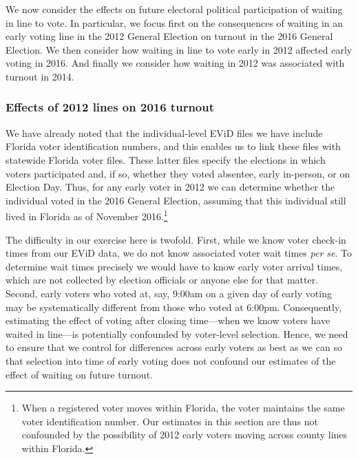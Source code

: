 \documentclass[12pt,titlepage]{article}
\begin{document}
We now consider the effects on future electoral political
participation of waiting in line to vote.  In particular, we focus
first on the consequences of waiting in an early voting line in the
2012 General Election on turnout in the 2016 General Election.  We
then consider how waiting in line to vote early in 2012 affected early
voting in 2016.  And finally we consider how waiting in 2012 was
associated with turnout in 2014.

\subsubsection*{Effects of 2012 lines on 2016 turnout}

We have already noted that the individual-level EViD files we have
include Florida voter identification numbers, and this enables us to
link these files with statewide Florida voter files.  These latter
files specify the elections in which voters participated and, if so,
whether they voted absentee, early in-person, or on Election Day.
Thus, for any early voter in 2012 we can determine whether the
individual voted in the 2016 General Election, assuming that this
individual still lived in Florida as of November 2016.\footnote{When
  a registered voter moves within Florida, the voter maintains the
  same voter identification number.  Our estimates in this section are
  thus not confounded by the possibility of 2012 early voters moving
  across county lines within Florida.}

The difficulty in our exercise here is twofold.  First, while we know
voter check-in times from our EViD data, we do not know associated
voter wait times \emph{per se}.  To determine wait times precisely we
would have to know early voter arrival times, which are not collected
by election officials or anyone else for that matter.  Second, early
voters who voted at, say, 9:00am on a given day of early voting may be
systematically different from those who voted at 6:00pm. Consequently,
estimating the effect of voting after closing time---when we know
voters have waited in line---is potentially confounded by voter-level
selection.  Hence, we need to ensure that we control for differences
across early voters as best as we can so that selection into time of
early voting does not confound our estimates of the effect of waiting
on future turnout.

\end{document}
